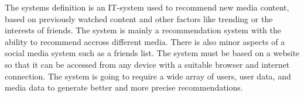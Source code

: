 The systems definition is an IT-system used to recommend new media content, based on previously watched content and other factors like trending or the interests of friends. The system is mainly a recommendation system with the ability to recommend accross different media. There is also minor aspects of a social media system such as a friends list. The system must be based on a website so that it can be accessed from any device with a suitable browser and internet connection. The system is going to require a wide array of users, user data, and media data to generate better and more precise recommendations. 